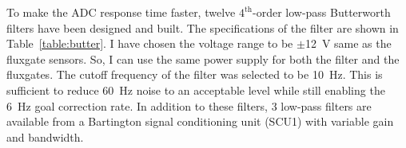 To make the ADC response time faster, twelve $\mathrm{4^{th}}$-order low-pass Butterworth filters have been designed and built. The specifications of the filter are shown in Table~\ref{table:butter}. I have chosen the voltage range to be $\pm$12~V same as the fluxgate sensors. So, I can use the same power supply for both the filter and the fluxgates. The cutoff frequency of the filter was selected to be 10~Hz. This is sufficient to reduce 60~Hz noise to an acceptable level while still enabling the 6~Hz goal correction rate. In addition to these filters, 3 low-pass filters are available from a Bartington signal conditioning unit (SCU1) with variable gain and bandwidth.


